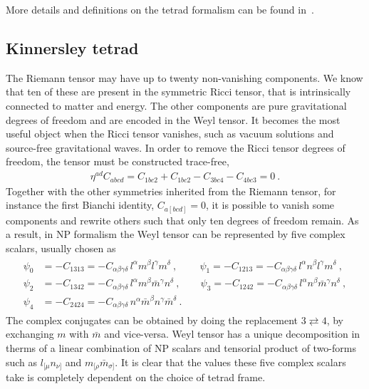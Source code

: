 More details and definitions on the tetrad formalism can be found in~.

\subsection{Kinnersley tetrad}

The Riemann tensor may have up to twenty non-vanishing components.
We know that ten of these are present in the symmetric Ricci tensor, that is intrinsically connected to matter and energy.
The other components are pure gravitational degrees of freedom and are encoded in the Weyl tensor.
It becomes the most useful object when the Ricci tensor vanishes, such as vacuum solutions and source-free gravitational waves.
In order to remove the Ricci tensor degrees of freedom, the tensor must be constructed trace-free,
\begin{align}
    \eta^{ad} C_{abcd} = C_{1bc2} + C_{1bc2} - C_{3bc4} - C_{4bc3} = 0 ~. 
\end{align}
Together with the other symmetries inherited from the Riemann tensor, for instance the first Bianchi identity, $C_{a[bcd]}=0$, it is possible to vanish some components and rewrite others such that only ten degrees of freedom remain.
As a result, in NP formalism the Weyl tensor can be represented by five complex scalars, usually chosen as
\begin{align}
    \begin{split}
        \psi_0 &= - C_{1313} = - C_{\alpha\beta\gamma\delta}\, l^\alpha m^\beta l^\gamma m^\delta ~,\qquad
        ~\psi_1 = - C_{1213} = - C_{\alpha\beta\gamma\delta}\, l^\alpha n^\beta l^\gamma m^\delta ~,\\
        \psi_2 &= - C_{1342} = - C_{\alpha\beta\gamma\delta}\, l^\alpha m^\beta \bar{m}^\gamma n^\delta ~,\qquad
        \psi_3 = - C_{1242} = - C_{\alpha\beta\gamma\delta}\, l^\alpha n^\beta \bar{m}^\gamma n^\delta ~,\\
        \psi_4 &= - C_{2424} = - C_{\alpha\beta\gamma\delta}\, n^\alpha \bar{m}^\beta n^\gamma \bar{m}^\delta ~.
    \end{split}
\end{align}
The complex conjugates can be obtained by doing the replacement $3 \rightleftarrows 4$, by exchanging $m$ with $\bar{m}$ and vice-versa. 
Weyl tensor has a unique decomposition in therms of a linear combination of NP scalars and tensorial product of two-forms such as $l_{[\mu} n_{\nu]}$ and $m_{[\rho} \bar{m}_{\sigma]}$. 
It is clear that the values these five complex scalars take is completely dependent on the choice of tetrad frame. 

